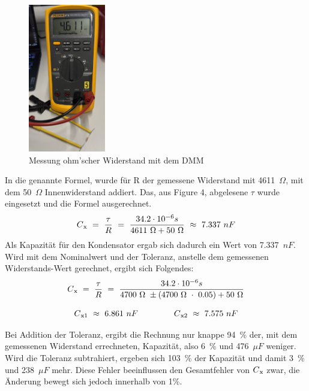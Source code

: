 \documentclass[a4paper,12pt]{article}
\begin{document}
\begin{figure}[H]
    \centering
    \includegraphics[width=0.3\textwidth]{../Quellen/Labor2/Fotos/IMG_3963gezoomt.jpeg}
\caption{Messung ohm'scher Widerstand mit dem DMM}
\end{figure}

\noindent In die genannte Formel, wurde für R der gemessene Widerstand mit 4611~$\Omega$, mit dem 50~$\Omega$ Innenwiderstand addiert. Das, aus Figure 4, abgelesene $\tau$ wurde eingesetzt und die Formel ausgerechnet.
\[
C\textsubscript{x} ~=~ \frac{\tau}{R} ~=~ \frac{34.2 \cdot 10^{-6}s}{4611~\Omega + 50~\Omega} ~\approx~ 7.337~nF
\]
\noindent Als Kapazität für den Kondensator ergab sich dadurch ein Wert von 7.337~$nF$.\\
Wird mit dem Nominalwert und der Toleranz, anstelle dem gemessenen Widerstands-Wert gerechnet, ergibt sich Folgendes:
\[
C\textsubscript{x} ~=~ \frac{\tau}{R} ~=~ \frac{34.2 \cdot 10^{-6}s}{4700~\Omega~\pm(4700~\Omega~\cdot~0.05) + 50~\Omega}
\]

\[
C\textsubscript{x1}~\approx~ 6.861~nF~~~~~~~~~~~~~
C\textsubscript{x2}~\approx~ 7.575~nF
\]

\noindent Bei Addition der Toleranz, ergibt die Rechnung nur knappe 94~\% der, mit dem gemessenen Widerstand errechneten, Kapazität, also 6~\% und 476~$\mu F$ weniger. Wird die Toleranz subtrahiert, ergeben sich 103~\% der Kapazität und damit 3~\% und 238~$\mu F$ mehr.
Diese Fehler beeinflussen den Gesamtfehler von \(C\textsubscript{x}\) zwar, die Änderung bewegt sich jedoch innerhalb von 1\%.
\end{document}
